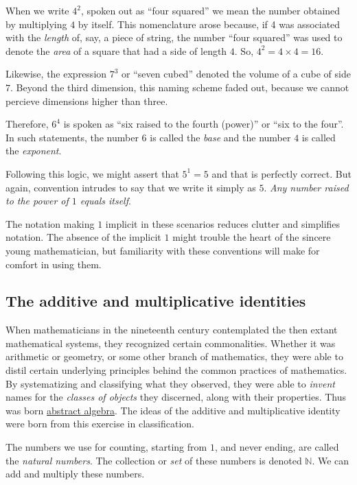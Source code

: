 \documentclass[
  a4paper,
]{article}
\begin{document}
When we write \(4^2\), spoken out as ``four squared'' we mean the number
obtained by multiplying \(4\) by itself. This nomenclature arose
because, if 4 was associated with the \emph{length} of, say, a piece of
string, the number ``four squared'' was used to denote the \emph{area}
of a square that had a side of length \(4\). So,
\(4^2 = 4\times4 = 16\).

Likewise, the expression \(7^3\) or ``seven cubed'' denoted the volume
of a cube of side \(7\). Beyond the third dimension, this naming scheme
faded out, because we cannot percieve dimensions higher than three.

Therefore, \(6^4\) is spoken as ``six raised to the fourth (power)'' or
``six to the four''. In such statements, the number \(6\) is called the
\emph{base} and the number \(4\) is called the \emph{exponent}.

Following this logic, we might assert that \(5^1 = 5\) and that is
perfectly correct. But again, convention intrudes to say that we write
it simply as \(5\). \emph{Any number raised to the power of \(1\) equals
itself}.

The notation making \(1\) implicit in these scenarios reduces clutter
and simplifies notation. The absence of the implicit \(1\) might trouble
the heart of the sincere young mathematician, but familiarity with these
conventions will make for comfort in using them.

\hypertarget{the-additive-and-multiplicative-identities}{%
\subsection{The additive and multiplicative
identities}\label{the-additive-and-multiplicative-identities}}

When mathematicians in the nineteenth century contemplated the then
extant mathematical systems, they recognized certain commonalities.
Whether it was arithmetic or geometry, or some other branch of
mathematics, they were able to distil certain underlying principles
behind the common practices of mathematics. By systematizing and
classifying what they observed, they were able to \emph{invent} names
for the \emph{classes of objects} they discerned, along with their
properties. Thus was born
\href{https://en.wikipedia.org/wiki/Abstract_algebra}{abstract algebra}.
The ideas of the additive and multiplicative identity were born from
this exercise in classification.

The numbers we use for counting, starting from \(1\), and never ending,
are called the \emph{natural numbers}. The collection or \emph{set} of
these numbers is denoted \(\mathbb{N}\). We can add and multiply these
numbers.
\end{document}
